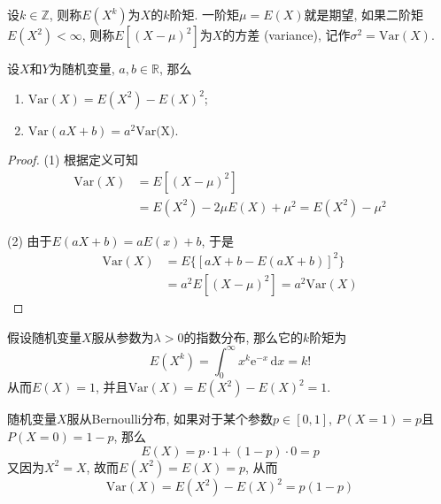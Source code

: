 \documentclass[cn, 12pt, math=mtpro2, bibstyle=apa, blue, twocol]{elegantbook}
\newcommand{\R}{\mathbb{R}}
\begin{document}
\begin{definition}
设$k\in\mathbb{Z}$, 则称$E(X^k)$为$X$的$k$阶矩. 一阶矩$\mu=E(X)$就是期望, 如果二阶矩$E(X^2)<\infty$, 则称$E[(X-\mu)^2]$为$X$的方差 (variance), 记作$\sigma^2=\text{Var}(X)$.

\end{definition}

\begin{theorem}
  设$X$和$Y$为随机变量, $a,b\in \R$, 那么
  \begin{enumerate}[label=(\arabic*)]
    \item $\text{Var}(X)=E(X^2)-E(X)^2$;
    \item $\text{Var}(aX+b)=a^2\text{Var(X)}$.
  \end{enumerate}
\end{theorem}
\begin{proof}
  (1) 根据定义可知
  \begin{align*}
  \text{Var}(X)&=E[(X-\mu)^2] \\
  &=E(X^2)-2\mu E(X)+\mu^2=E(X^2)-\mu^2
  \end{align*}

  (2) 由于$E(aX+b)=aE(x)+b$, 于是
  \begin{align*}
  \text{Var}(X)&=E\{[aX+b-E(aX+b)]^2\} \\
  &=a^2E[(X-\mu)^2]=a^2\text{Var}(X)
  \end{align*}
\end{proof}

\begin{example}
假设随机变量$X$服从参数为$\lambda>0$的指数分布, 那么它的$k$阶矩为
$$E(X^k)=\int_{0}^{\infty}x^k\text{e}^{-x}\,\text{d}x=k!$$
从而$E(X)=1$, 并且$\text{Var}(X)=E(X^2)-E(X)^2=1$.
\end{example}

\begin{example}
随机变量$X$服从Bernoulli分布, 如果对于某个参数$p\in[0,1]$, $P(X=1)=p$且$P(X=0)=1-p$, 那么
$$E(X)=p\cdot 1+(1-p)\cdot 0=p$$
又因为$X^2=X$, 故而$E(X^2)=E(X)=p$, 从而
$$\text{Var}(X)=E(X^2)-E(X)^2=p(1-p)$$
\end{example}
\end{document}
